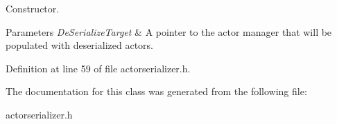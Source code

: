 Constructor. 


\begin{DoxyParams}{Parameters}
{\em DeSerializeTarget} & A pointer to the actor manager that will be populated with deserialized actors. \\
\hline
\end{DoxyParams}


Definition at line 59 of file actorserializer.h.



The documentation for this class was generated from the following file:\begin{DoxyCompactItemize}
\item 
actorserializer.h\end{DoxyCompactItemize}

